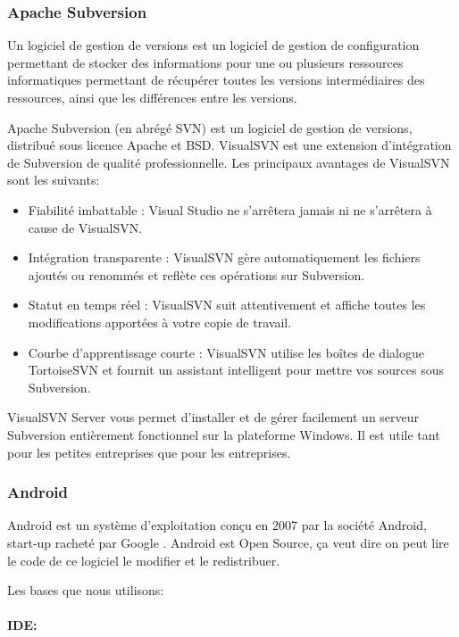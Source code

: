 \subsubsection{Apache Subversion}

Un logiciel de gestion de versions est un logiciel de gestion de configuration
permettant de stocker des informations pour une ou plusieurs ressources
informatiques permettant de récupérer toutes les versions intermédiaires des
ressources, ainsi que les différences entre les versions.

Apache Subversion (en abrégé SVN) est un logiciel de gestion de versions,
distribué sous licence Apache et BSD.
VisualSVN est une extension d’intégration de Subversion de qualité professionnelle.
Les principaux avantages de VisualSVN sont les suivants:

\begin{itemize}
    \item Fiabilité imbattable : Visual Studio ne s’arrêtera jamais ni ne
        s’arrêtera à cause de VisualSVN.
    \item Intégration transparente : VisualSVN gère automatiquement les fichiers
        ajoutés ou renommés et reflète ces opérations sur Subversion.
    \item Statut en temps réel : VisualSVN suit attentivement et affiche toutes
        les modifications apportées à votre copie de travail.
    \item Courbe d’apprentissage courte : VisualSVN utilise les boîtes de
        dialogue TortoiseSVN et fournit un assistant intelligent pour mettre
        vos sources sous Subversion.
\end{itemize}
VisualSVN Server vous permet d’installer et de gérer facilement un serveur
Subversion entièrement fonctionnel sur la plateforme Windows. Il est utile tant
pour les petites entreprises que pour les entreprises.

\subsubsection{Android}

Android est un système d'exploitation conçu en 2007 par la société Android,
start-up racheté par Google . Android est Open Source, ça veut dire on peut lire
le code de ce logiciel le modifier et le redistribuer.

Les bases que nous utilisons:

\paragraph{IDE:}

